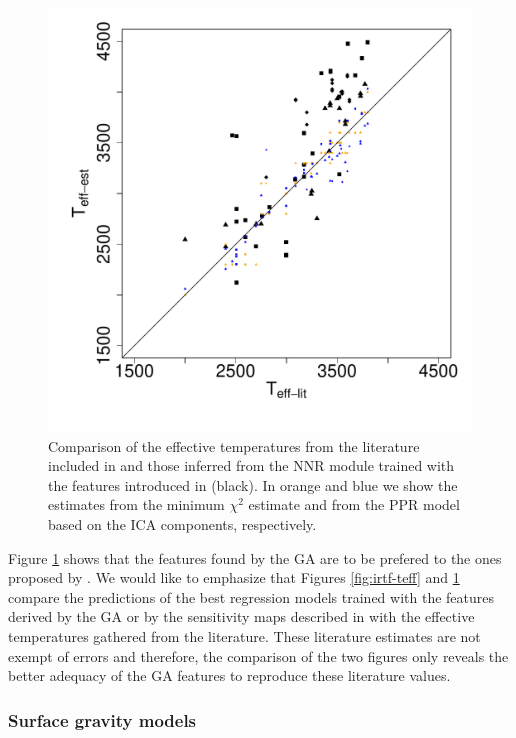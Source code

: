 \begin {figure}
 \centering
  \includegraphics[scale=0.4]{figs/irtf-CESteffs-literature}
  
  \caption{Comparison of the effective temperatures from the
  literature included in \protect\cite{cesetti} and those inferred from the
  NNR module trained with the features introduced in \protect\cite{cesetti}
  (black). In orange and blue we show the estimates from the minimum
  $\chi^2$ estimate and from the PPR model based on the ICA
  components, respectively.}

\label{fig:irtf-cesteff}
\end {figure}

Figure \ref{fig:irtf-cesteff} shows that the features found by the GA
are to be prefered to the ones proposed by \cite{cesetti}. We would
like to emphasize that Figures \ref{fig:irtf-teff}
and \ref{fig:irtf-cesteff} compare the predictions of the best
regression models trained with the features derived by the GA or by
the sensitivity maps described in \cite{cesetti} with the effective
temperatures gathered from the literature. These literature estimates
are not exempt of errors and therefore, the comparison of the two
figures only reveals the better adequacy of the GA features to
reproduce these literature values.

\subsubsection{Surface gravity models}

